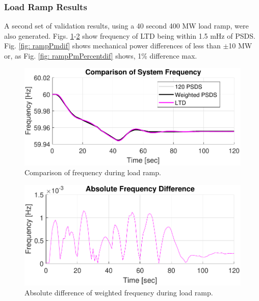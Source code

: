 \subsubsection{Load Ramp Results}
A second set of validation results, using a 40 second 400 MW load ramp, were also generated. 
Figs. \ref{fig: rampFcomp}-\ref{fig: rampFdif} show frequency of LTD being within 1.5 mHz of PSDS.
Fig. \ref{fig: rampPmdif} shows mechanical power differences of less than $\pm$10 MW or, as Fig. \ref{fig: rampPmPercentdif} shows, 1\% difference max.

\begin{figure}[!ht]
	\centering
	\includegraphics[width=\linewidth]{figures/miniWECC3ALTDrampF3}
	\caption{Comparison of frequency during load ramp.}
	\label{fig: rampFcomp}
\end{figure}

\begin{figure}[!ht]
	\centering
	\includegraphics[width=\linewidth]{figures/miniWECC3ALTDrampRelF}
	\caption{Absolute difference of weighted frequency during load ramp.}
	\label{fig: rampFdif}
\end{figure}

